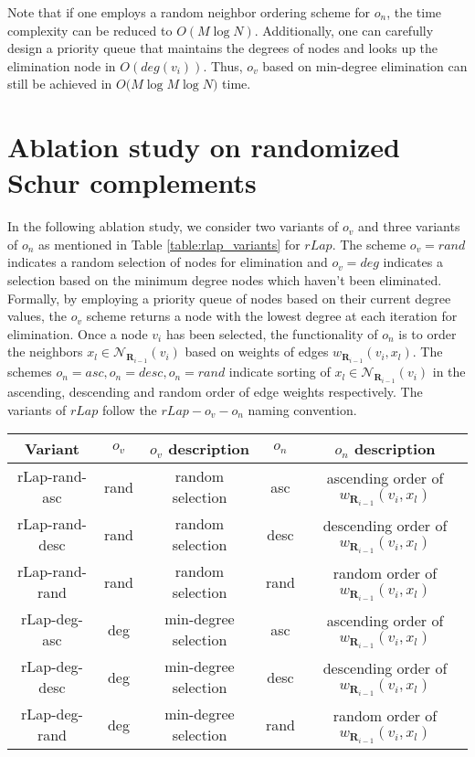 \documentclass{article}
\def\mR{{\mathbf{R}}}
\theoremstyle{plain}
\theoremstyle{definition}
\theoremstyle{remark}
\begin{document}
Note that if one employs a random neighbor ordering scheme for $o_n$, the time complexity can be reduced to $O(M \log N)$. Additionally, one can carefully design a priority queue that maintains the degrees of nodes and looks up the elimination node in $O(deg(v_i))$. Thus, $o_v$ based on min-degree elimination can still be achieved in $ O \bigg( M \log M \log N \bigg) $ time.

\section{Ablation study on randomized Schur complements}
\label{app:rlap_ablation}

In the following ablation study, we consider two variants of $o_v$ and three variants of $o_n$ as mentioned in Table \ref{table:rlap_variants} for $rLap$. The scheme $o_v=rand$ indicates a random selection of nodes for elimination and $o_v=deg$ indicates a selection based on the minimum degree nodes which haven't been eliminated. Formally, by employing a priority queue of nodes based on their current degree values, the $o_v$ scheme returns a node with the lowest degree at each iteration for elimination. Once a node $v_i$ has been selected, the functionality of $o_n$ is to order the neighbors $x_l \in \mathcal{N}_{\mR_{i-1}}(v_i)$ based on weights of edges $w_{\mR_{i-1}}(v_i, x_l)$. The schemes $o_n=asc, o_n=desc, o_n=rand$ indicate sorting of $x_l \in \mathcal{N}_{\mR_{i-1}}(v_i)$ in the ascending, descending and random order of edge weights respectively. The variants of $rLap$ follow the $rLap-o_v-o_n$ naming convention.

\begin{table*}[ht!]
\centering
\caption{Variants of $rLap$ based on $o_v, o_n$.}
\label{table:rlap_variants}
\vskip 0.15in
\begin{center}
\begin{small}
\begin{sc}
\begin{tabular}{c|c|c|c|c}
\toprule
Variant & $o_v$ & $o_v$ description & $o_n$ & $o_n$ description\\
\midrule
rLap-rand-asc & rand & random selection & asc & ascending order of $w_{\mR_{i-1}}(v_i, x_l)$  \\
rLap-rand-desc & rand & random selection & desc & descending order of $w_{\mR_{i-1}}(v_i, x_l)$  \\
rLap-rand-rand & rand & random selection & rand & random order of $w_{\mR_{i-1}}(v_i, x_l)$  \\
rLap-deg-asc & deg & min-degree selection & asc & ascending order of $w_{\mR_{i-1}}(v_i, x_l)$  \\
rLap-deg-desc & deg & min-degree selection & desc & descending order of $w_{\mR_{i-1}}(v_i, x_l)$  \\
rLap-deg-rand & deg & min-degree selection & rand & random order of $w_{\mR_{i-1}}(v_i, x_l)$  \\
\bottomrule
\end{tabular}
\end{sc}
\end{small}
\end{center}
\vskip -0.1in
\end{table*}
\end{document}
